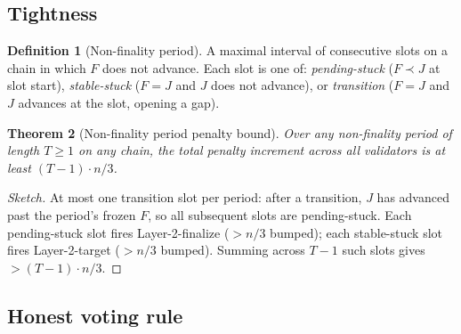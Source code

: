\documentclass{article}
\theoremstyle{plain}
\newtheorem{theorem}{Theorem}
\theoremstyle{definition}
\newtheorem{definition}[theorem]{Definition}
\theoremstyle{remark}
\begin{document}
\subsection{Tightness}

\begin{definition}[Non-finality period]\label{def:non-fin-period}
A maximal interval of consecutive slots on a chain in which $F$ does not advance. Each slot is one of: \emph{pending-stuck} ($F \prec J$ at slot start), \emph{stable-stuck} ($F = J$ and $J$ does not advance), or \emph{transition} ($F = J$ and $J$ advances at the slot, opening a gap).
\end{definition}

\begin{theorem}[Non-finality period penalty bound]\label{thm:tightness}
Over any non-finality period of length $T \geq 1$ on any chain, the total penalty increment across all validators is at least $(T - 1) \cdot n/3$.
\end{theorem}

\begin{proof}[Sketch]
At most one transition slot per period: after a transition, $J$ has advanced past the period's frozen $F$, so all subsequent slots are pending-stuck. Each pending-stuck slot fires Layer-2-finalize ($> n/3$ bumped); each stable-stuck slot fires Layer-2-target ($> n/3$ bumped). Summing across $T-1$ such slots gives $> (T-1)\cdot n/3$.
\end{proof}

\subsection{Honest voting rule}\label{sec:voting-rule}
\end{document}

